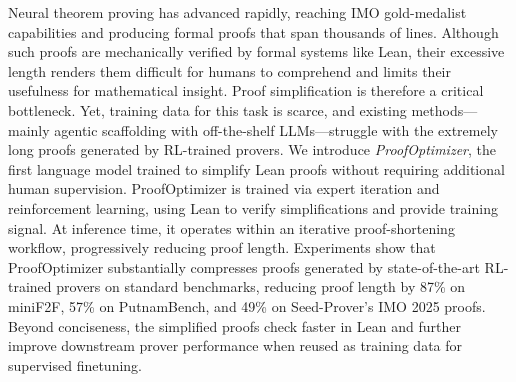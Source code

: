Neural theorem proving has advanced rapidly, reaching IMO gold-medalist capabilities and producing formal proofs that span thousands of lines. Although such proofs are mechanically verified by formal systems like Lean, their excessive length renders them difficult for humans to comprehend and limits their usefulness for mathematical insight. Proof simplification is therefore a critical bottleneck. Yet, training data for this task is scarce, and existing methods---mainly agentic scaffolding with off-the-shelf LLMs---struggle with the extremely long proofs generated by RL-trained provers. We introduce \emph{ProofOptimizer}, the first language model trained to simplify Lean proofs without requiring additional human supervision. ProofOptimizer is trained via expert iteration and reinforcement learning, using Lean to verify simplifications and provide training signal. At inference time, it operates within an iterative proof-shortening workflow, progressively reducing proof length. Experiments show that ProofOptimizer substantially compresses proofs generated by state-of-the-art RL-trained provers on standard benchmarks, reducing proof length by 87\% on miniF2F, 57\% on PutnamBench, and 49\% on Seed-Prover's IMO 2025 proofs. Beyond conciseness, the simplified proofs check faster in Lean and further improve downstream prover performance when reused as training data for supervised finetuning.
